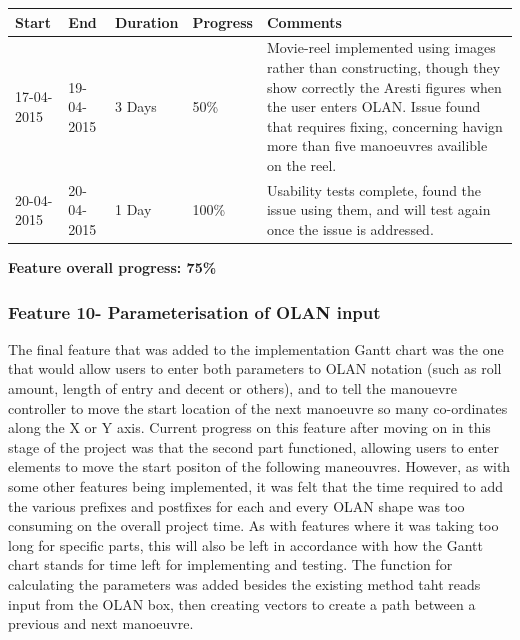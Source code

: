 \begin{table}[h]
\begin{tabular}{|l|l|l|l|p{7cm}|}
\hline
\textbf{Start} & \textbf{End} & \textbf{Duration} & \textbf{Progress} & \textbf{Comments}                                                                                                     \\ \hline
17-04-2015     & 19-04-2015   & 3 Days            & 50\%             &  Movie-reel implemented using images rather than constructing, though they show correctly the Aresti figures when the user enters OLAN. Issue found that requires fixing, concerning havign more than five manoeuvres availible on the reel.\\ \hline
20-04-2015     & 20-04-2015   & 1 Day            & 100\%             &  Usability tests complete, found the issue using them, and will test again once the issue is addressed.\\ \hline
\end{tabular}
\end{table}

\textbf{Feature overall progress: 75\%}

\subsubsection{Feature 10- Parameterisation of OLAN input}
The final feature that was added to the implementation Gantt chart was the one that would allow users to enter both parameters to OLAN notation (such as roll amount, length of entry and decent or others), and to tell the manouevre controller to move the start location of the next manoeuvre so many co-ordinates along the X or Y axis. Current progress on this feature after moving on in this stage of the project was that the second part functioned, allowing users to enter elements to move the start positon of the following maneouvres. However, as with some other features being implemented, it was felt that the time required to add the various prefixes and postfixes for each and every OLAN shape was too consuming on the overall project time. As with features where it was taking too long for specific parts, this will also be left in accordance with how the Gantt chart stands for time left for implementing and testing. The function for calculating the parameters was added besides the existing method taht reads input from the OLAN box, then creating vectors to create a path between a previous and next manoeuvre.


